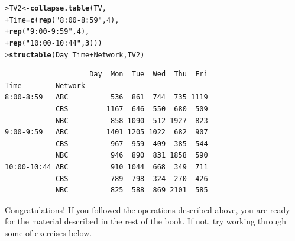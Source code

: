 \documentclass[10pt,krantz2]{krantz}\usepackage[]{graphicx}\usepackage[]{color}
\makeatletter
\newcommand{\hlnum}[1]{\textcolor[rgb]{0.686,0.059,0.569}{#1}}%
\newcommand{\hlstr}[1]{\textcolor[rgb]{0.192,0.494,0.8}{#1}}%
\newcommand{\hlopt}[1]{\textcolor[rgb]{0,0,0}{#1}}%
\newcommand{\hlstd}[1]{\textcolor[rgb]{0.345,0.345,0.345}{#1}}%
\newcommand{\hlkwb}[1]{\textcolor[rgb]{0.69,0.353,0.396}{#1}}%
\newcommand{\hlkwc}[1]{\textcolor[rgb]{0.333,0.667,0.333}{#1}}%
\newcommand{\hlkwd}[1]{\textcolor[rgb]{0.737,0.353,0.396}{\textbf{#1}}}%
\newenvironment{kframe}{%
 \def\at@end@of@kframe{}%
 \ifinner\ifhmode%
  \def\at@end@of@kframe{\end{minipage}}%
  \begin{minipage}{\columnwidth}%
 \fi\fi%
 \def\FrameCommand##1{\hskip\@totalleftmargin \hskip-\fboxsep
 \colorbox{shadecolor}{##1}\hskip-\fboxsep
     \hskip-\linewidth \hskip-\@totalleftmargin \hskip\columnwidth}%
 \MakeFramed {\advance\hsize-\width
   \@totalleftmargin\z@ \linewidth\hsize
   \@setminipage}}%
 {\par\unskip\endMakeFramed%
 \at@end@of@kframe}
\newenvironment{knitrout}{}{} %
\renewenvironment{knitrout}{\small\renewcommand{\baselinestretch}{.85}}{} %
\makeatother
\begin{document}

\begin{knitrout}
\color{fgcolor}\begin{kframe}
\begin{alltt}
\hlstd{> }\hlstd{TV2} \hlkwb{<-} \hlkwd{collapse.table}\hlstd{(TV,}
\hlstd{+ }                      \hlkwc{Time} \hlstd{=} \hlkwd{c}\hlstd{(}\hlkwd{rep}\hlstd{(}\hlstr{"8:00-8:59"}\hlstd{,} \hlnum{4}\hlstd{),}
\hlstd{+ }                               \hlkwd{rep}\hlstd{(}\hlstr{"9:00-9:59"}\hlstd{,} \hlnum{4}\hlstd{),}
\hlstd{+ }                               \hlkwd{rep}\hlstd{(}\hlstr{"10:00-10:44"}\hlstd{,} \hlnum{3}\hlstd{)))}
\hlstd{> }\hlkwd{structable}\hlstd{(Day} \hlopt{~} \hlstd{Time} \hlopt{+} \hlstd{Network, TV2)}
\end{alltt}
\begin{verbatim}
                    Day  Mon  Tue  Wed  Thu  Fri
Time        Network                             
8:00-8:59   ABC          536  861  744  735 1119
            CBS         1167  646  550  680  509
            NBC          858 1090  512 1927  823
9:00-9:59   ABC         1401 1205 1022  682  907
            CBS          967  959  409  385  544
            NBC          946  890  831 1858  590
10:00-10:44 ABC          910 1044  668  349  711
            CBS          789  798  324  270  426
            NBC          825  588  869 2101  585
\end{verbatim}
\end{kframe}
\end{knitrout}

Congratulations! If you followed the operations described above,
you are ready for the material described in the rest of the book.
If not, try working through some of exercises below.

\end{document}
